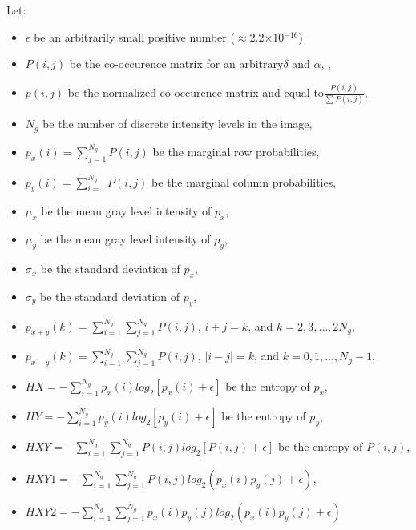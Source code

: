 Let:
\begin{itemize}
\item $\epsilon $ be an arbitrarily small positive number (${\approx}$2.2${\times}$10$^{-16}$)
\item $P\left(i,j\right)$ be the co-occurence matrix for an arbitrary$\delta $ and $\alpha $, ,
\item $p\left(i,j\right)$ be the normalized co-occurence matrix and equal to$\frac{P\left(i,j\right)}{\sum P\left(i,j\right)}$,
\item $N_{g}$ be the number of discrete intensity levels in the image,
\item $p_{x}\left(i\right)=\sum _{j=1}^{N_{g}}P\left(i,j\right)$ be the marginal row probabilities,
\item $p_{y}\left(i\right)=\sum _{i=1}^{N_{g}}P\left(i,j\right)$ be the marginal column probabilities,
\item $\mu _{x}$ be the mean gray level intensity of $p_{x}$,
\item $\mu _{y}$ be the mean gray level intensity of $p_{y}$,
\item $\sigma _{x}$ be the standard deviation of $p_{x}$,
\item $\sigma _{y}$ be the standard deviation of $p_{y}$,
\item $p_{x+y}\left(k\right)=\sum _{i=1}^{N_{g}}\sum _{j=1}^{N_{g}}P\left(i,j\right)$,  $i+j=k$, and $k=2,3,\ldots ,2N_{g}$,
\item $p_{x-y}\left(k\right)=\sum _{i=1}^{N_{g}}\sum _{j=1}^{N_{g}}P\left(i,j\right)$,  $\left| i-j\right| =k$, and $k=0,1,\ldots ,N_{g}-1$,
\item $HX=-\sum _{i=1}^{N_{g}}p_{x}\left(i\right)log_{2}\left[p_{x}\left(i\right)+\epsilon \right]$ be the entropy of $p_{x}$,
\item $HY=-\sum _{i=1}^{N_{g}}p_{y}\left(i\right)log_{2}\left[p_{y}\left(i\right)+\epsilon \right]$ be the entropy of $p_{y}$,
\item$HXY=-\sum _{i=1}^{N_{g}}\sum _{j=1}^{N_{g}}P\left(i,j\right)log_{2}\left[P\left(i,j\right)+\epsilon \right]$ be the entropy of $P\left(i,j\right)$,
\item $HXY1=-\sum _{i=1}^{N_{g}}\sum _{j=1}^{N_{g}}P\left(i,j\right)log_{2}\left(p_{x}\left(i\right)p_{y}\left(j\right)+\epsilon \right)$,
\item $HXY2=-\sum _{i=1}^{N_{g}}\sum _{j=1}^{N_{g}}p_{x}\left(i\right)p_{y}\left(j\right)log_{2}\left(p_{x}\left(i\right)p_{y}\left(j\right)+\epsilon \right)$
\end{itemize}
